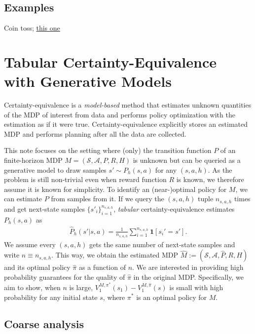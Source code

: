 \subsection{Examples}
Coin toss;
\href{https://courses.cs.washington.edu/courses/cse312/20su/files/student_drive/6.3.pdf}{this one}


\section{Tabular Certainty-Equivalence with Generative Models}
Certainty-equivalence is a {\em model-based} method that estimates unknown quantities of the MDP of interest from data and performs policy optimization with the estimation as if it were true.
Certainty-equivalence explicitly stores an estimated MDP and performs planning after all the data are collected.

This note focuses on the setting where (only) the transition function $P$ of an finite-horizon MDP $M=(\mathcal{S},\mathcal{A}, P, R, H)$ is unknown but can be queried as a generative model to draw samples $s'\sim P_h(s,a)$ for any $(s,a,h)$.
As the problem is still non-trivial even when reward function $R$ is known, we therefore assume it is known for simplicity.
To identify an (near-)optimal policy for $M$, we can estimate $P$ from samples from it.
If we query the $(s,a,h)$ tuple $n_{s,a,h}$ times and get next-state samples $\{s'_i\}_{i=1}^{n_{s,a,h}}$, {\em tabular} certainty-equivalence estimates $P_h(s,a)$ as 
\begin{align*}
    \widehat{P}_h\left(s' | s, a\right)=\frac{1}{n_{s,a,h}} \sum_{i=1}^{n_{s,a,h}} \mathbf{1}\left[s_i'=s'\right] .
\end{align*}
We assume every $(s,a,h)$ gets the same number of next-state samples and write $n\equiv n_{s,a,h}$. This way, we obtain the estimated MDP $\widehat{M}:=(\mathcal{S},\mathcal{A}, \widehat{P}, R, H)$ and its optimal policy $\widehat{\pi}$ as a function of $n$.
We are interested in providing high probability guarantees for the quality of $\widehat{\pi}$ in the original MDP.
Specifically, we aim to show, when $n$ is large, $V^{M,\pi^*}_1(s_1) - V^{M,\widehat{\pi}}_1(s)$ is small with high probability for any initial state $s$, where $\pi^*$ is an optimal policy for $M$.

\subsection{Coarse analysis}

